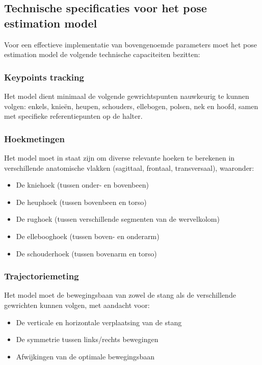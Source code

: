 \subsection{Technische specificaties voor het pose estimation model}

Voor een effectieve implementatie van bovengenoemde parameters moet het pose estimation model de volgende technische capaciteiten bezitten:

\subsubsection{Keypoints tracking}
Het model dient minimaal de volgende gewrichtspunten nauwkeurig te kunnen volgen: enkels, knieën, heupen, schouders, ellebogen, polsen, nek en hoofd, samen met specifieke referentiepunten op de halter.

\subsubsection{Hoekmetingen}
Het model moet in staat zijn om diverse relevante hoeken te berekenen in verschillende anatomische vlakken (sagittaal, frontaal, transversaal), waaronder:
\begin{itemize}
    \item De kniehoek (tussen onder- en bovenbeen)
    \item De heuphoek (tussen bovenbeen en torso)
    \item De rughoek (tussen verschillende segmenten van de wervelkolom)
    \item De ellebooghoek (tussen boven- en onderarm)
    \item De schouderhoek (tussen bovenarm en torso)
\end{itemize}

\subsubsection{Trajectoriemeting}
Het model moet de bewegingsbaan van zowel de stang als de verschillende gewrichten kunnen volgen, met aandacht voor:
\begin{itemize}
    \item De verticale en horizontale verplaatsing van de stang
    \item De symmetrie tussen links/rechts bewegingen
    \item Afwijkingen van de optimale bewegingsbaan
\end{itemize}

